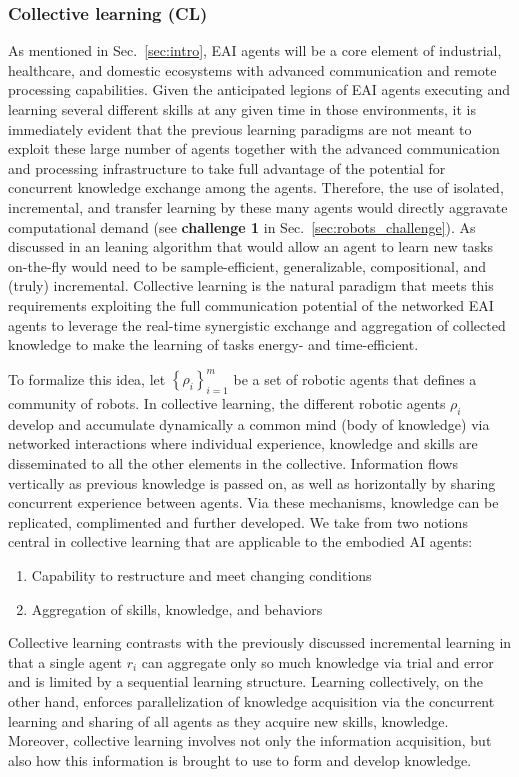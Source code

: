 \subsubsection{\textbf{Collective learning (CL)}}
As mentioned in Sec.~\ref{sec:intro}, EAI agents will be a core element of industrial, healthcare, and domestic ecosystems with advanced communication and remote processing capabilities. Given the anticipated legions of EAI agents executing and learning several different skills at any given time in those environments, it is immediately evident that the previous learning paradigms are not meant to exploit these large number of agents together with the advanced communication and processing infrastructure to take full advantage of the potential for concurrent knowledge exchange among the agents. Therefore, the use of isolated, incremental, and transfer learning by these many agents 
would directly aggravate computational demand (see \textbf{challenge 1} in Sec.~\ref{sec:robots_challenge}). As discussed in \cite{Kaelbling2020foundationefficientrobot} an leaning algorithm that would allow an agent to learn new tasks on-the-fly would need to be sample-efficient, generalizable, compositional, and (truly) incremental. Collective learning is the natural paradigm that meets this requirements exploiting the full communication potential of the networked EAI agents to leverage the real-time synergistic exchange and aggregation of collected knowledge to make the learning of tasks energy- and time-efficient.

To formalize this idea, let $ \left\lbrace \rho_i \right\rbrace_{i=1}^{m} $ be a set of robotic agents that defines a community of robots. In collective learning, the different robotic agents $ \rho_i $ develop and accumulate dynamically a common mind (body of knowledge) via networked interactions where individual experience, knowledge and skills are disseminated to all the other elements in the collective. Information flows vertically as previous knowledge is passed on, as well as horizontally by sharing concurrent experience between agents. Via these mechanisms, knowledge can be replicated, complimented and further developed. We take from \cite{Garavan2012CollectiveLearning} two notions central in collective learning that are applicable to the embodied AI agents:
\begin{enumerate}
	\item Capability to restructure and meet changing conditions
	\item Aggregation of skills, knowledge, and behaviors
\end{enumerate}
Collective learning contrasts with the previously discussed incremental learning in that a single agent $ r_i $ can aggregate only so much knowledge via trial and error and is limited by a sequential learning structure. Learning collectively, on the other hand, enforces parallelization of knowledge acquisition via the concurrent learning and sharing of all agents as they acquire new skills, knowledge. Moreover, collective learning involves not only the information acquisition, but also how this information is brought to use to form and develop knowledge. 

